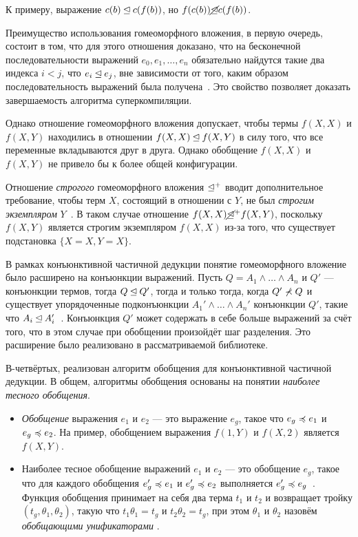 К примеру, выражение $c(b) \unlhd c(f(b))$, но $f(c(b)) \cancel{\unlhd} c(f(b))$.

Преимущество использования гомеоморфного вложения, в первую очередь, состоит в том,
что для этого отношения доказано, что на бесконечной последовательности выражений $e_0, e_1, \dots, e_n$
обязательно найдутся такие два индекса $i < j$, что $e_i \unlhd e_j$, вне зависимости
от того, каким образом последовательность выражений была получена~\cite{scPos}.
Это свойство позволяет доказать завершаемость алгоритма суперкомпиляции.

Однако отношение гомеоморфного вложения допускает, чтобы термы $f(X, X)$ и $f(X, Y)$
находились в отношении  $f(X, X) \unlhd f(X, Y)$ в силу того,
что все переменные вкладываются друг в друга. Однако обобщение
$f(X, X)$ и $f(X, Y)$ не привело бы к более общей конфигурации.

Отношение \emph{строгого} гомеоморфного вложения $\unlhd^+$ вводит дополнительное
требование, чтобы терм $X$, состоящий в отношении с $Y$, не был \emph{строгим экземпляром} $Y$~\cite{homeo}.
В таком случае отношение $f(X, X) \cancel{\unlhd}^+ f(X, Y)$, поскольку $f(X, Y)$ является строгим
экземпляром $f(X, X)$ из-за того, что существует подстановка $\{ X = X, Y = X \}$.

В рамках конъюнктивной частичной дедукции понятие гомеоморфного вложение было расширено на конъюнкции выражений.
Пусть $Q = A_1 \land \dots \land A_n$ и $Q'$ --- конъюнкции термов, тогда $Q \unlhd Q'$, тогда и только тогда,
когда $Q' \not\prec Q$ и существует упорядоченные подконъюнкции $A_1' \land \dots \land A_n'$
конъюнкции $Q'$, такие что $A_i \unlhd A_i'$~\cite{cpd}.
Конъюнкция $Q'$ может содержать в себе больше выражений за счёт того, что в этом случае при обобщении
произойдёт шаг разделения. Это расширение было реализовано в рассматриваемой библиотеке.



В-четвёртых, реализован алгоритм обобщения для конъюнктивной частичной дедукции.
В общем, алгоритмы обобщения основаны на понятии \emph{наиболее тесного обобщения}.
\begin{itemize}
\item \emph{Обобщение} выражения $e_1$ и $e_2$ --- это выражение $e_g$, такое что
$e_g \preccurlyeq e_1$  и $e_g \preccurlyeq e_2$. На пример, обобщением выражения
$f(1, Y)$ и $f(X, 2)$ является $f(X, Y)$.
\item Наиболее тесное обобщение 
выражений $e_1$ и $e_2$ --- это обобщение $e_g$, такое что
для каждого обобщения $e_g' \preccurlyeq e_1$ и $e_g' \preccurlyeq e_2$ выполняется $e_g' \preccurlyeq e_g$~\cite{scPos}.
Функция обобщения принимает на себя два терма $t_1$ и $t_2$ и возвращает
тройку $(t_g, \theta_1, \theta_2)$, такую что $t_1 \theta_1 = t_g$ и $t_2 \theta_2 = t_g$,
при этом $\theta_1$ и $\theta_2$ назовём \emph{обобщающими унификаторами} .
\end{itemize}

